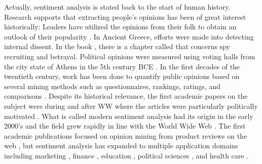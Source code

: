 Actually, sentiment analysis is stated back to the start of human history. Research supports that extracting people's opinions has been of great interest historically: Leaders have utilized the opinions from their folk to obtain an outlook of their popularity \cite{SA-history-MANTYLA201816}. In Ancient Greece, efforts were made into detecting internal dissent. In the book , there is a chapter called  that concerns spy recruiting and betrayal. Political opinions were measured using voting halls from the city state of Athens in the 5th century BCE \cite{ATHEN-voting-thorley2012athenian}.  In the first decades of the twentieth century, work has been done to quantify public opinions based on several mining methods such as questionnaires, rankings, ratings, and comparisons \cite{mining-methods-droba1931methods}. Despite its historical relevance, the first academic papers on the subject were during and after WW\MakeUppercase{} where the articles were particularly politically motivated \cite{SA-history-MANTYLA201816}. What is called modern sentiment analysis had its origin in the early 2000's and the field grew rapidly in line with the World Wide Web \cite{deep-learning-WIRE}. The first academic publications focused on opinion mining from product reviews on the web \cite{describe-polarity-dave2003mining}, but sentiment analysis has expanded to multiple application domains including marketing \cite{marketing-sa-rambocas2018online}, finance \cite{stock_price1}, education \cite{education_domain}, political sciences \cite{political-science-sa-rice2021corpus}, and health care \cite{healthcare-sa-gohil2018sentiment}. \\

